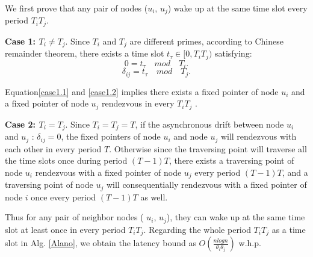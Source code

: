 \begin{IEEEproof}
We first prove that any pair of nodes ($u_i$, $u_j$) wake up 
at the same time slot every period $T_iT_j$.

\textbf{Case 1: $T_i \neq T_j$}. Since $T_i$ and $T_j$ are different primes, 
according to Chinese remainder theorem, there exists a time slot $t_\tau \in \lbrack 0,T_iT_j ) $ satisfying:
\begin{equation}
\label{case1.1}
0 = t_\tau  \quad mod \quad  T_i.
\end{equation}
\begin{equation}
\label{case1.2}
\delta_{ij} = t_\tau  \quad mod \quad  T_j.
\end{equation}

Equation\ref{case1.1} and \ref{case1.2}  implies there exists a fixed pointer of node $u_i$ 
and a fixed pointer of node $u_j$ rendezvous in every $T_iT_j$  .

\textbf{Case 2: $T_i = T_j$}. Since $T_i = T_j = T$, if the asynchronous drift between 
node $u_i$ and $u_j$ : $\delta_{ij} = 0$, the fixed pointers of node $u_i$ and node $u_j$ will 
rendezvous with each other in every period $T$.
Otherwise since the traversing point will traverse all the time slots once during period $(T-1)T$,
there exists a traversing point of node $u_i$ rendezvous with a fixed pointer
of node $u_j$ every period $(T-1)T$, and a traversing point of node $u_j$ 
will consequentially rendezvous with a fixed pointer
of node $i$ once every period $(T-1)T$ as well.

Thus for any pair of neighbor nodes ( $u_i$, $u_j$), they can wake up
at the same time slot at least once in every period $T_iT_j$. Regarding 
the whole period $T_iT_j$ as a time slot in Alg. \ref{Alano}, we obtain the latency 
bound as $O(\frac{nlogn}{\theta_i\theta_j})$ w.h.p.
\end{IEEEproof}




